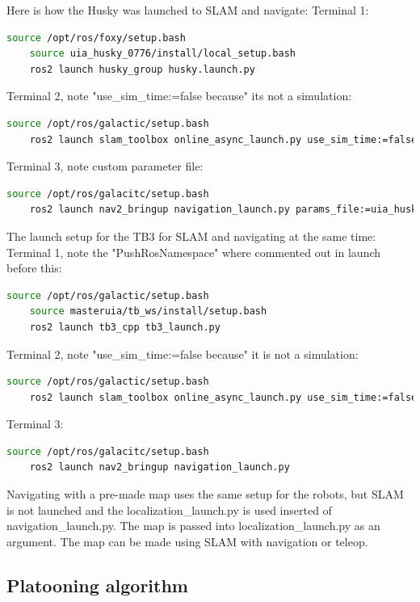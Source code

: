 Here is how the Husky was launched to SLAM and navigate: 
Terminal 1:
\begin{lstlisting}[language=bash]
    source /opt/ros/foxy/setup.bash
    source uia_husky_0776/install/local_setup.bash
    ros2 launch husky_group husky.launch.py
\end{lstlisting}
Terminal 2, note "use\_sim\_time:=false because" its not a simulation:
\begin{lstlisting}[language=bash]
    source /opt/ros/galactic/setup.bash
    ros2 launch slam_toolbox online_async_launch.py use_sim_time:=false
\end{lstlisting}
Terminal 3, note custom parameter file:
\begin{lstlisting}[language=bash]
    source /opt/ros/galacitc/setup.bash
    ros2 launch nav2_bringup navigation_launch.py params_file:=uia_husky_0776/husky_group/params/nav2_params.yaml
\end{lstlisting}

The launch setup for the TB3 for SLAM and navigating at the same time: 
Terminal 1, note the "PushRosNamespace" where commented out in launch before this: 
\begin{lstlisting}[language=bash]
    source /opt/ros/galactic/setup.bash
    source masteruia/tb_ws/install/setup.bash
    ros2 launch tb3_cpp tb3_launch.py
\end{lstlisting}
Terminal 2, note "use\_sim\_time:=false because" it is not a simulation:
\begin{lstlisting}[language=bash]
    source /opt/ros/galactic/setup.bash
    ros2 launch slam_toolbox online_async_launch.py use_sim_time:=false
\end{lstlisting}
Terminal 3: 
\begin{lstlisting}[language=bash]
    source /opt/ros/galacitc/setup.bash
    ros2 launch nav2_bringup navigation_launch.py 
\end{lstlisting}

Navigating with a pre-made map uses the same setup for the robots, but SLAM is not launched and the localization\_launch.py is used inserted of navigation\_launch.py. The map is passed into localization\_launch.py as an argument. The map can be made using SLAM with navigation or teleop. 

\subsection{Platooning algorithm} \label{Platooning_algorithm}

